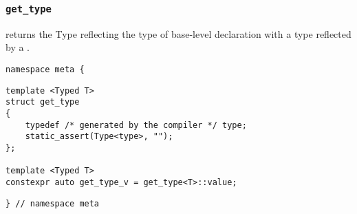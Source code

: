 
\subsubsection{\texttt{get\_type}}

returns the Type reflecting the type of base-level declaration with a type reflected by a .

\begin{verbatim}
namespace meta {
\end{verbatim}
\begin{verbatim}
template <Typed T>
struct get_type
{
	typedef /* generated by the compiler */ type;
	static_assert(Type<type>, "");
};
	
template <Typed T>
constexpr auto get_type_v = get_type<T>::value;
\end{verbatim}
\begin{verbatim}
} // namespace meta
\end{verbatim}
